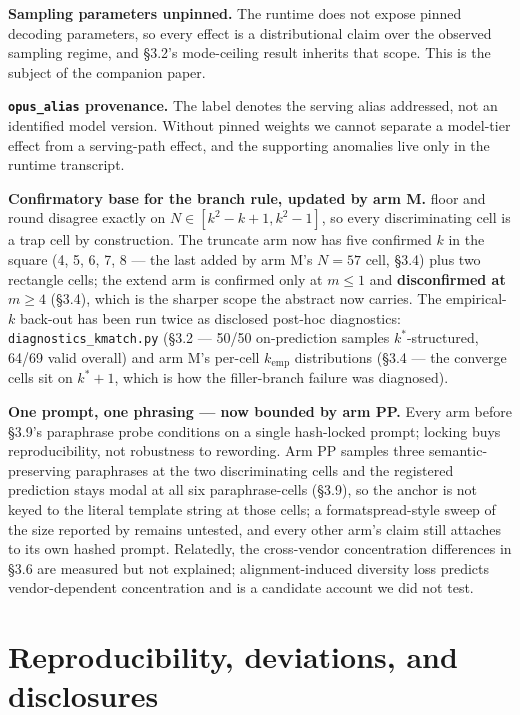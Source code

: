 \textbf{Sampling parameters unpinned.} The runtime does not expose pinned decoding parameters, so
every effect is a distributional claim over the observed sampling regime, and \S3.2's
mode-ceiling result inherits that scope. This is the subject of the companion paper.

\textbf{\texttt{opus\_alias} provenance.} The label denotes the serving alias addressed, not an identified
model version. Without pinned weights we cannot separate a model-tier effect from a serving-path
effect, and the supporting anomalies live only in the runtime transcript.

\textbf{Confirmatory base for the branch rule, updated by arm M.} floor and round disagree exactly
on $N \in [k^2-k+1, k^2-1]$, so every discriminating cell is a trap cell by construction. The
truncate arm now has five confirmed $k$ in the square (4, 5, 6, 7, 8 --- the last added by arm M's
$N = 57$ cell, \S3.4) plus two rectangle cells; the extend arm is confirmed only at $m \le 1$ and
\textbf{disconfirmed at $m \ge 4$} (\S3.4), which is the sharper scope the abstract now carries. The
empirical-$k$ back-out has been run twice as
disclosed post-hoc diagnostics: \texttt{diagnostics\_kmatch.py} (\S3.2 --- 50/50 on-prediction samples
$k^*$-structured, 64/69 valid overall) and arm M's per-cell $k_{\mathrm{emp}}$ distributions (\S3.4 --- the
converge cells sit on $k^*{+}1$, which is how the filler-branch failure was diagnosed).

\textbf{One prompt, one phrasing --- now bounded by arm PP.} Every arm before \S3.9's paraphrase probe conditions on a single hash-locked prompt; locking buys reproducibility, not robustness to rewording. Arm PP samples three semantic-preserving paraphrases at the two discriminating cells and the registered prediction stays modal at all six paraphrase-cells (\S3.9), so the anchor is not keyed to the literal template string at those cells; a formatspread-style sweep of the size reported by \citet{sclar2024formatspread} remains untested, and every other arm's claim still attaches to its own hashed prompt. Relatedly, the cross-vendor concentration differences in \S3.6 are measured but not explained; alignment-induced diversity loss \citep{kirk2024rlhf} predicts vendor-dependent concentration and is a candidate account we did not test.

\section{Reproducibility, deviations, and disclosures}

